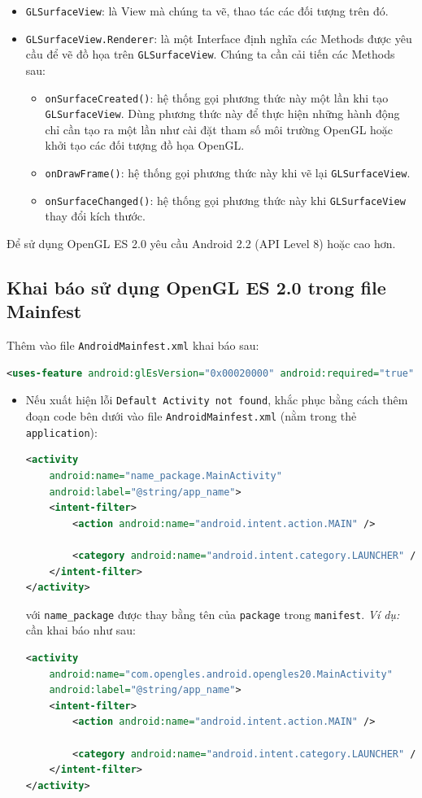 \documentclass[13pt,a4paper]{extreport}
\begin{document}
	\begin{itemize}
		\item \verb|GLSurfaceView|: là View mà chúng ta vẽ, thao tác các đối tượng trên đó.
		
		\item \verb|GLSurfaceView.Renderer|: là một Interface định nghĩa các Methods được yêu cầu để vẽ đồ họa trên \verb|GLSurfaceView|. Chúng ta cần cải tiến các Methods sau:
			\begin{itemize}
				\item \verb|onSurfaceCreated()|: hệ thống gọi phương thức này một lần khi tạo \verb|GLSurfaceView|. Dùng phương thức này để thực hiện những hành động chỉ cần tạo ra một lần như cài đặt tham số môi trường OpenGL hoặc khởi tạo các đối tượng đồ họa OpenGL.
				
				\item \verb|onDrawFrame()|: hệ thống gọi phương thức này khi vẽ lại \verb|GLSurfaceView|.
				
				\item \verb|onSurfaceChanged()|: hệ thống gọi phương thức này khi \verb|GLSurfaceView| thay đổi kích thước.
			\end{itemize}
	\end{itemize}
	
	Để sử dụng OpenGL ES 2.0 yêu cầu Android 2.2 (API Level 8) hoặc cao hơn.
\subsection{Khai báo sử dụng OpenGL ES 2.0 trong file Mainfest}
	Thêm vào file \verb|AndroidMainfest.xml| khai báo sau:	
		\begin{lstlisting}[language=XML]
<uses-feature android:glEsVersion="0x00020000" android:required="true" />
		\end{lstlisting}
	
	\begin{itemize}
		\item Nếu xuất hiện lỗi \verb|Default Activity not found|, khắc phục bằng cách thêm đoạn code bên dưới vào file \verb|AndroidMainfest.xml| (nằm trong thẻ \verb|application|):
		\begin{lstlisting}[language=XML]
<activity
	android:name="name_package.MainActivity"
	android:label="@string/app_name">
	<intent-filter>
		<action android:name="android.intent.action.MAIN" />

		<category android:name="android.intent.category.LAUNCHER" />
	</intent-filter>
</activity>
		\end{lstlisting}
	với \verb|name_package| được thay bằng tên của \verb|package| trong \verb|manifest|. \emph{Ví dụ:} cần khai báo như sau:
	
		\begin{lstlisting}[language=XML]
<activity
	android:name="com.opengles.android.opengles20.MainActivity"
	android:label="@string/app_name">
	<intent-filter>
		<action android:name="android.intent.action.MAIN" />

		<category android:name="android.intent.category.LAUNCHER" />
	</intent-filter>
</activity>
		\end{lstlisting}
	\end{itemize}
		
\end{document}
